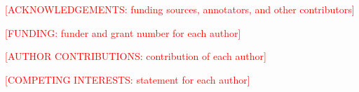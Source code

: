 \documentclass[pdflatex,sn-nature]{sn-jnl}%
\begin{document}



\textcolor{red}{[ACKNOWLEDGEMENTS: funding sources, annotators, and other contributors]}


\textcolor{red}{[FUNDING: funder and grant number for each author]}


\textcolor{red}{[AUTHOR CONTRIBUTIONS: contribution of each author]}


\textcolor{red}{[COMPETING INTERESTS: statement for each author]}

\end{document}
